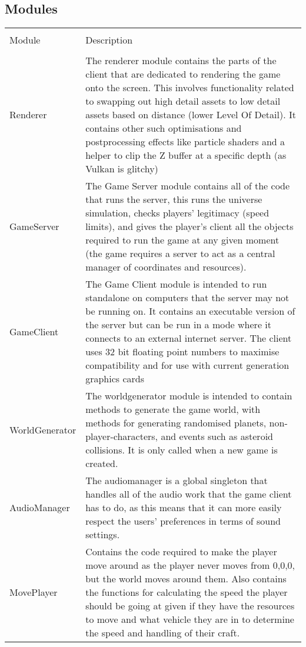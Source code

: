 \documentclass[12pt, DIV=calc]{scrartcl}
\begin{document}
\subsection{Modules}
\begin{xltabular}[c]{\textwidth}{| X | X |}
    \hline \\
Module & Description \\
    \hline \hline \\
Renderer & The renderer module contains the parts of the client that are dedicated to rendering the game onto the screen. This involves functionality related to swapping out high detail assets to low detail assets based on distance (lower Level Of Detail). It contains other such optimisations and postprocessing effects like particle shaders and a helper to clip the Z buffer at a specific depth (as Vulkan is glitchy)  \\ \hline
GameServer & The Game Server module contains all of the code that runs the server, this runs the universe simulation, checks players' legitimacy (speed limits), and gives the player's client all the objects required to run the game at any given moment (the game requires a server to act as a central manager of coordinates and resources).  \\ \hline
GameClient & The Game Client module is intended to run standalone on computers that the server may not be running on. It contains an executable version of the server but can be run in a mode where it connects to an external internet server. The client uses 32 bit floating point numbers to maximise compatibility and for use with current generation graphics cards  \\ \hline
WorldGenerator & The worldgenerator module is intended to contain methods to generate the game world, with methods for generating randomised planets, non-player-characters, and events such as asteroid collisions. It is only called when a new game is created.  \\ \hline
AudioManager & The audiomanager is a global singleton that handles all of the audio work that the game client has to do, as this means that it can more easily respect the users' preferences in terms of sound settings.  \\ \hline
MovePlayer & Contains the code required to make the player move around as the player never moves from 0,0,0, but the world moves around them. Also contains the functions for calculating the speed the player should be going at given if they have the resources to move and what vehicle they are in to determine the speed and handling of their craft.  \\ \hline
\end{xltabular}
\end{document}
